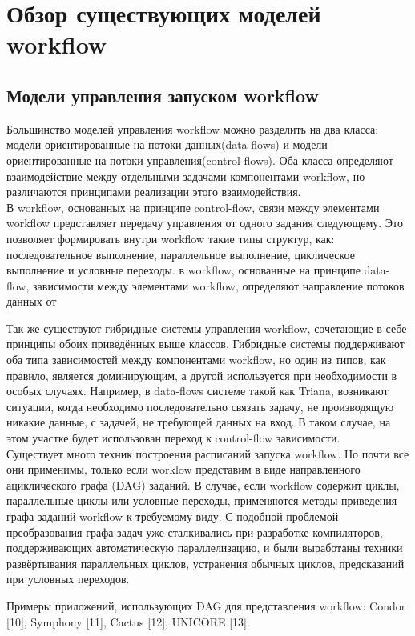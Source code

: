 \documentclass[a4paper,12pt]{article}
\begin{document}
\section{Обзор существующих моделей workflow}
\subsection{Модели управления запуском workflow}
  Большинство моделей управления workflow можно разделить на два класса: модели ориентированные на потоки данных(data-flows) и модели ориентированные на потоки управления(control-flows). Оба класса определяют взаимодействие между отдельными задачами-компонентами workflow, но различаются принципами реализации этого взаимодействия.  \\
  В workflow, основанных на принципе control-flow, связи между элементами workflow  представляет передачу управления от одного задания следующему. Это позволяет формировать внутри workflow такие типы структур, как: последовательное выполнение, параллельное выполнение, циклическое выполнение и условные переходы. в workflow, основанные на принципе data-flow, зависимости между элементами workflow, определяют направление потоков данных от 
  
  Так же существуют гибридные системы управления workflow, сочетающие в себе принципы обоих приведённых выше классов. Гибридные системы поддерживают оба типа зависимостей между компонентами workflow, но  один из типов, как правило, является доминирующим, а другой используется при необходимости  в особых случаях. Например, в data-flows системе такой как Triana, возникают ситуации, когда необходимо последовательно связать задачу, не производящую никакие данные, с задачей, не  требующей данных на вход. В таком случае, на этом участке будет использован переход к control-flow зависимости.\\
 
 
Существует много техник построения расписаний запуска workflow. Но почти все они применимы, только если worklow представим в виде направленного ациклического графа (DAG) заданий. В случае, если workflow содержит циклы, параллельные циклы или условные переходы, применяются методы приведения графа заданий workflow к требуемому виду. С подобной проблемой преобразования графа задач уже сталкивались при разработке компиляторов, поддерживающих автоматическую параллелизацию, и были выработаны техники развёртывания параллельных циклов, устранения обычных циклов, предсказаний при условных переходов.

Примеры приложений, использующих DAG для представления workflow: Condor [10], Symphony [11], Cactus [12], UNICORE [13].
\end{document}
